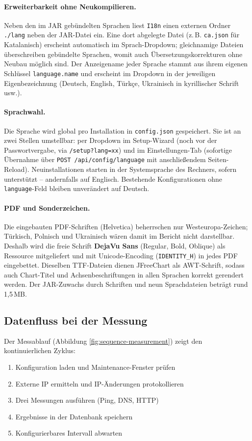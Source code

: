 \paragraph{Erweiterbarkeit ohne Neukompilieren.} Neben den im JAR gebündelten
Sprachen liest \texttt{I18n} einen externen Ordner \texttt{./lang} neben der
JAR-Datei ein. Eine dort abgelegte Datei (z.\,B. \texttt{ca.json} für
Katalanisch) erscheint automatisch im Sprach-Dropdown; gleichnamige Dateien
überschreiben gebündelte Sprachen, womit auch Übersetzungskorrekturen ohne
Neubau möglich sind. Der Anzeigename jeder Sprache stammt aus ihrem eigenen
Schlüssel \texttt{language.name} und erscheint im Dropdown in der jeweiligen
Eigenbezeichnung (Deutsch, English, Türkçe, Ukrainisch in kyrillischer
Schrift usw.).

\paragraph{Sprachwahl.} Die Sprache wird global pro Installation in
\texttt{config.json} gespeichert. Sie ist an zwei Stellen umstellbar: per
Dropdown im Setup-Wizard (noch vor der Passwortvergabe, via
\texttt{/setup?lang=xx}) und im Einstellungen-Tab (sofortige Übernahme über
\texttt{POST /api/config/language} mit anschließendem Seiten-Reload).
Neuinstallationen starten in der Systemsprache des Rechners, sofern
unterstützt -- andernfalls auf Englisch. Bestehende Konfigurationen ohne
\texttt{language}-Feld bleiben unverändert auf Deutsch.

\paragraph{PDF und Sonderzeichen.} Die eingebauten PDF-Schriften (Helvetica)
beherrschen nur Westeuropa-Zeichen; Türkisch, Polnisch und Ukrainisch wären
damit im Bericht nicht darstellbar. Deshalb wird die freie Schrift
\textbf{DejaVu Sans} (Regular, Bold, Oblique) als Ressource mitgeliefert und
mit Unicode-Encoding (\texttt{IDENTITY\_H}) in jedes PDF eingebettet. Dieselben
TTF-Dateien dienen JFreeChart als AWT-Schrift, sodass auch Chart-Titel und
Achsenbeschriftungen in allen Sprachen korrekt gerendert werden. Der
JAR-Zuwachs durch Schriften und neun Sprachdateien beträgt rund 1,5\,MB.

\subsection{Datenfluss bei der Messung}

Der Messablauf (Abbildung \ref{fig:sequence-measurement}) zeigt den kontinuierlichen
Zyklus:
\begin{enumerate}
  \item Konfiguration laden und Maintenance-Fenster prüfen
  \item Externe IP ermitteln und IP-Änderungen protokollieren
  \item Drei Messungen ausführen (Ping, DNS, HTTP)
  \item Ergebnisse in der Datenbank speichern
  \item Konfigurierbares Intervall abwarten
\end{enumerate}

